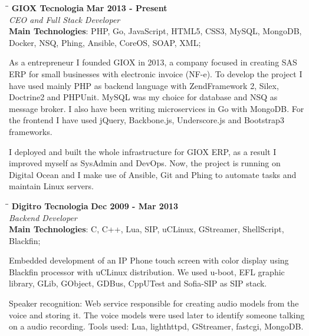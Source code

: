 \documentclass[margin]{res}
\begin{document}
\begin{resume}
\vspace{-0.1in}
    \begin{tabbing}
    \hspace{2.3in}\= \hspace{1.7in}\= \kill
    \textbf{GIOX Tecnologia}    \>\>\textbf{Mar 2013 - Present}\\
    \textit{CEO and Full Stack Developer}\\
    \textbf{Main Technologies}: PHP, Go, JavaScript, HTML5, CSS3, MySQL, MongoDB,\\Docker, NSQ, Phing, Ansible, CoreOS, SOAP, XML;
    \end{tabbing}\vspace{-20pt}
    \vspace{2mm}
As a entrepreneur I founded GIOX in 2013, a company focused in creating SAS ERP for small businesses with electronic invoice (NF-e). To develop the project I have used mainly PHP as backend language with ZendFramework 2, Silex, Doctrine2 and PHPUnit. MySQL was my choice for database and NSQ as message broker. I also have been writing microservices in Go with MongoDB. For the frontend I have used jQuery, Backbone.js, Underscore.js and Bootstrap3 frameworks.

I deployed and built the whole infrastructure for GIOX ERP, as a result I improved myself as SysAdmin and DevOps. Now, the project is running on Digital Ocean and I make use of Ansible, Git and Phing to automate tasks and maintain Linux servers.

\vspace{-0.1in}
    \begin{tabbing}
    \hspace{2.3in}\= \hspace{1.7in}\= \kill
    \textbf{Digitro Tecnologia}    \>\>\textbf{Dec 2009 - Mar 2013}\\
    \textit{Backend Developer}\\
    \textbf{Main Technologies}: C, C++, Lua, SIP, uCLinux, GStreamer, ShellScript, Blackfin;
    \end{tabbing}\vspace{-20pt}
    \vspace{2mm}
Embedded development of an IP Phone touch screen with color display using Blackfin processor with uCLinux distribution. We used u-boot, EFL graphic library, GLib, GObject, GDBus, CppUTest and Sofia-SIP as SIP stack.

Speaker recognition: Web service responsible for creating audio models from the voice and storing it. The voice models were used later to identify someone talking on a audio recording. Tools used: Lua, lighthttpd, GStreamer, fastcgi, MongoDB.


\end{resume}
\end{document}

